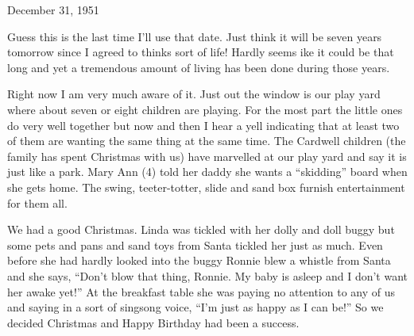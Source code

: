 \documentclass[]{book}
\begin{document}
December 31, 1951

Guess this is the last time I'll use that date. Just think it will be seven years tomorrow since I agreed to thinks sort of life! Hardly seems ike it could be that long and yet a tremendous amount of living has been done during those years.

Right now I am very much aware of it. Just out the window is our play yard where about seven or eight children are playing. For the most part the little ones do very well together but now and then I hear a yell indicating that at least two of them are wanting the same thing at the same time. The Cardwell children (the family has spent Christmas with us) have marvelled at our play yard and say it is just like a park. Mary Ann (4) told her daddy she wants a ``skidding'' board when she gets home. The swing, teeter-totter, slide and sand box furnish entertainment for them all.

We had a good Christmas. Linda was tickled with her dolly and doll buggy but some pets and pans and sand toys from Santa tickled her just as much. Even before she had hardly looked into the buggy Ronnie blew a whistle from Santa and she says, ``Don't blow that thing, Ronnie. My baby is asleep and I don't want her awake yet!'' At the breakfast table she was paying no attention to any of us and saying in a sort of singsong voice, ``I'm just as happy as I can be!'' So we decided Christmas and Happy Birthday had been a success.


\end{document}
